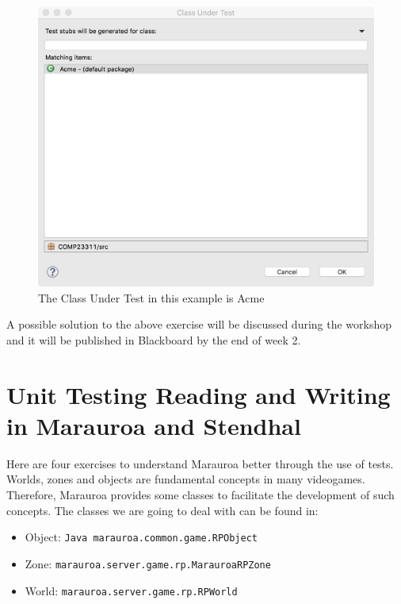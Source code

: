 \documentclass[
]{book}
\providecommand{\tightlist}{%
  \setlength{\itemsep}{0pt}\setlength{\parskip}{0pt}}
\begin{document}
\begin{figure}

{\centering \includegraphics[width=1\linewidth]{images/junit-classundertest} 

}

\caption{The Class Under Test in this example is Acme}\label{fig:junit-classundertest-fig}
\end{figure}

A possible solution to the above exercise will be discussed during the workshop and it will be published in Blackboard by the end of week 2.

\hypertarget{unittestingr}{%
\section{Unit Testing Reading and Writing in Marauroa and Stendhal}\label{unittestingr}}

Here are four exercises to understand Marauroa better through the use of tests. Worlds, zones and objects are fundamental concepts in many videogames. Therefore, Marauroa provides some classes to facilitate the development of such concepts. The classes we are going to deal with can be found in:

\begin{itemize}
\tightlist
\item
  Object: \texttt{Java\ marauroa.common.game.RPObject}
\item
  Zone: \texttt{marauroa.server.game.rp.MarauroaRPZone}
\item
  World: \texttt{marauroa.server.game.rp.RPWorld}
\end{itemize}
\end{document}

